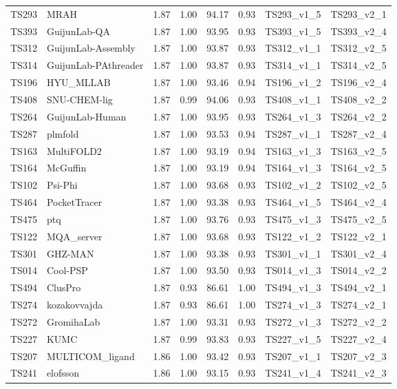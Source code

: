 \begin{longtable}{llllllll}
TS293 & MRAH & 1.87 & 1.00 & 94.17 & 0.93 & TS293\_v1\_5 & TS293\_v2\_1 \\ 
TS393 & GuijunLab-QA & 1.87 & 1.00 & 93.95 & 0.93 & TS393\_v1\_5 & TS393\_v2\_4 \\ 
TS312 & GuijunLab-Assembly & 1.87 & 1.00 & 93.87 & 0.93 & TS312\_v1\_1 & TS312\_v2\_5 \\ 
TS314 & GuijunLab-PAthreader & 1.87 & 1.00 & 93.87 & 0.93 & TS314\_v1\_1 & TS314\_v2\_5 \\ 
TS196 & HYU\_MLLAB & 1.87 & 1.00 & 93.46 & 0.94 & TS196\_v1\_2 & TS196\_v2\_4 \\ 
TS408 & SNU-CHEM-lig & 1.87 & 0.99 & 94.06 & 0.93 & TS408\_v1\_1 & TS408\_v2\_2 \\ 
TS264 & GuijunLab-Human & 1.87 & 1.00 & 93.95 & 0.93 & TS264\_v1\_3 & TS264\_v2\_2 \\ 
TS287 & plmfold & 1.87 & 1.00 & 93.53 & 0.94 & TS287\_v1\_1 & TS287\_v2\_4 \\ 
TS163 & MultiFOLD2 & 1.87 & 1.00 & 93.19 & 0.94 & TS163\_v1\_3 & TS163\_v2\_5 \\ 
TS164 & McGuffin & 1.87 & 1.00 & 93.19 & 0.94 & TS164\_v1\_3 & TS164\_v2\_5 \\ 
TS102 & Psi-Phi & 1.87 & 1.00 & 93.68 & 0.93 & TS102\_v1\_2 & TS102\_v2\_5 \\ 
TS464 & PocketTracer & 1.87 & 1.00 & 93.38 & 0.93 & TS464\_v1\_5 & TS464\_v2\_4 \\ 
TS475 & ptq & 1.87 & 1.00 & 93.76 & 0.93 & TS475\_v1\_3 & TS475\_v2\_5 \\ 
TS122 & MQA\_server & 1.87 & 1.00 & 93.68 & 0.93 & TS122\_v1\_2 & TS122\_v2\_1 \\ 
TS301 & GHZ-MAN & 1.87 & 1.00 & 93.38 & 0.93 & TS301\_v1\_1 & TS301\_v2\_4 \\ 
TS014 & Cool-PSP & 1.87 & 1.00 & 93.50 & 0.93 & TS014\_v1\_3 & TS014\_v2\_2 \\ 
TS494 & ClusPro & 1.87 & 0.93 & 86.61 & 1.00 & TS494\_v1\_3 & TS494\_v2\_1 \\ 
TS274 & kozakovvajda & 1.87 & 0.93 & 86.61 & 1.00 & TS274\_v1\_3 & TS274\_v2\_1 \\ 
TS272 & GromihaLab & 1.87 & 1.00 & 93.31 & 0.93 & TS272\_v1\_3 & TS272\_v2\_2 \\ 
TS227 & KUMC & 1.87 & 0.99 & 93.83 & 0.93 & TS227\_v1\_5 & TS227\_v2\_4 \\ 
TS207 & MULTICOM\_ligand & 1.86 & 1.00 & 93.42 & 0.93 & TS207\_v1\_1 & TS207\_v2\_3 \\ 
TS241 & elofsson & 1.86 & 1.00 & 93.15 & 0.93 & TS241\_v1\_4 & TS241\_v2\_3 \\ 

\end{longtable}
